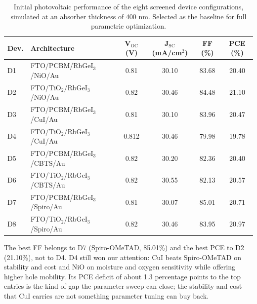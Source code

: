 \documentclass[review]{elsarticle}
\begin{document}
\begin{table}[htbp]
\centering
{\footnotesize\setlength{\tabcolsep}{3pt}
\begin{tabularx}{\textwidth}{XXcccc}
\hline
Dev. & Architecture & V$_{\mathrm{OC}}$ (V) & J$_{\mathrm{SC}}$ (mA/cm$^{2}$) & FF (\%) & PCE (\%)
\\\hline
D1 & FTO/\allowbreak{}PCBM/\allowbreak{}RbGeI$_{3}$/NiO/\allowbreak{}Au & 0.81 & 30.10 & 83.68 & 20.40\\
D2 & FTO/\allowbreak{}TiO$_{2}$/RbGeI$_{3}$/NiO/\allowbreak{}Au & 0.82 & 30.46 & 84.48 & 21.10\\
D3 & FTO/\allowbreak{}PCBM/\allowbreak{}RbGeI$_{3}$/CuI/\allowbreak{}Au & 0.81 & 30.10 & 83.96 & 20.47\\
D4 & FTO/\allowbreak{}TiO$_{2}$/RbGeI$_{3}$/CuI/\allowbreak{}Au & 0.812 & 30.46 & 79.98 & 19.78\\
D5 & FTO/\allowbreak{}PCBM/\allowbreak{}RbGeI$_{3}$/CBTS/\allowbreak{}Au & 0.82 & 30.20 & 82.36 & 20.40\\
D6 & FTO/\allowbreak{}TiO$_{2}$/RbGeI$_{3}$/CBTS/\allowbreak{}Au & 0.82 & 30.55 & 82.13 & 20.57\\
D7 & FTO/\allowbreak{}PCBM/\allowbreak{}RbGeI$_{3}$/Spiro/Au & 0.81 & 30.07 & 85.01 & 20.71\\
D8 & FTO/\allowbreak{}TiO$_{2}$/RbGeI$_{3}$/Spiro/Au & 0.82 & 30.46 & 83.95 & 20.97\\
\hline
\end{tabularx}
}
\caption{Initial photovoltaic performance of the eight screened device configurations, simulated at an absorber thickness of 400 nm.  Selected as the baseline for full parametric optimization.}
\end{table}
The best FF belongs to D7 (Spiro-OMeTAD, 85.01\%) and the best PCE to D2 (21.10\%), not to D4. D4 still won our attention: CuI beats Spiro-OMeTAD on stability and cost and NiO on moisture and oxygen sensitivity while offering higher hole mobility. Its PCE deficit of about 1.3 percentage points to the top entries is the kind of gap the parameter sweep can close; the stability and cost that CuI carries are not something parameter tuning can buy back.
\end{document}
